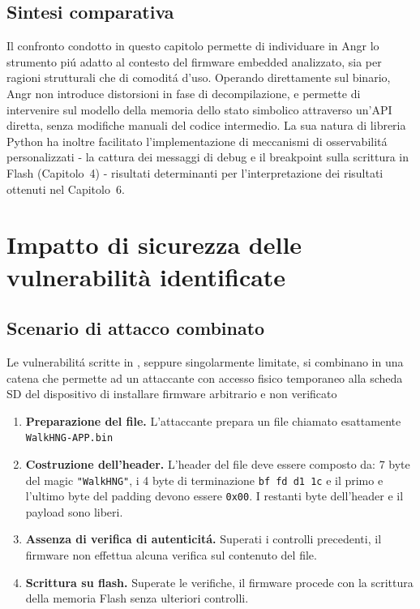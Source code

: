         \subsection{Sintesi comparativa}
        \label{subsec:sintesi}
            Il confronto condotto in questo capitolo permette di individuare in Angr lo strumento piú adatto al contesto del firmware embedded analizzato, sia per ragioni strutturali che di comoditá d'uso.
            Operando direttamente sul binario, Angr non introduce distorsioni in fase di decompilazione, e permette di intervenire sul modello della memoria dello stato simbolico attraverso un'API diretta, senza modifiche manuali del codice intermedio. La sua natura di libreria Python ha inoltre facilitato l'implementazione di meccanismi di osservabilitá personalizzati - la cattura dei messaggi di debug e il breakpoint sulla scrittura in Flash (Capitolo~4) - risultati determinanti per l'interpretazione dei risultati ottenuti nel Capitolo~6.

    \section{Impatto di sicurezza delle vulnerabilità identificate}
    \label{subsec:impatto_vulnerabilitá}
        \subsection{Scenario di attacco combinato}
        \label{subsec:scenario_di_attacco}
            Le vulnerabilitá scritte in , seppure singolarmente limitate, si combinano in una catena che permette ad un attaccante con accesso fisico temporaneo alla scheda SD del dispositivo di installare firmware arbitrario e non verificato
            \begin{enumerate}
                \item \textbf{Preparazione del file.} L'attaccante prepara un file chiamato esattamente \texttt{WalkHNG-APP.bin}
                \item \textbf{Costruzione dell'header.} L'header del file deve essere composto da:  7 byte del magic \texttt{"WalkHNG"}, i 4 byte di terminazione \texttt{bf fd d1 1c} e il primo e l'ultimo byte del padding devono essere \texttt{0x00}. I restanti byte dell'header e il payload sono liberi.
                \item \textbf{Assenza di verifica di autenticitá.} Superati i controlli precedenti, il firmware non effettua alcuna verifica sul contenuto del file.
                \item \textbf{Scrittura su flash.} Superate le verifiche, il firmware procede con la scrittura della memoria Flash senza ulteriori controlli.
            \end{enumerate}
    
